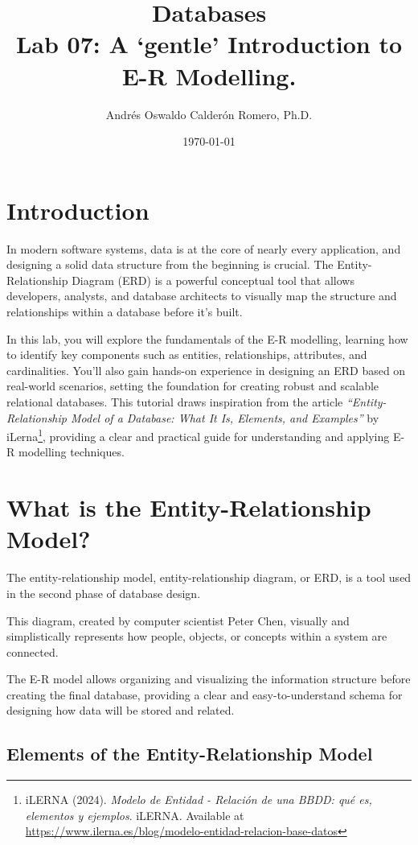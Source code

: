 \documentclass{article}
\title{Databases \\ Lab 07: A `gentle' Introduction to E-R Modelling.}
\author{Andrés Oswaldo Calderón Romero, Ph.D.}
\date{\today}
\begin{document}
\maketitle

\section{Introduction}

In modern software systems, data is at the core of nearly every application, and designing a solid data structure from the beginning is crucial. The Entity-Relationship Diagram (ERD) is a powerful conceptual tool that allows developers, analysts, and database architects to visually map the structure and relationships within a database before it's built.

In this lab, you will explore the fundamentals of the E-R modelling, learning how to identify key components such as entities, relationships, attributes, and cardinalities. You'll also gain hands-on experience in designing an ERD based on real-world scenarios, setting the foundation for creating robust and scalable relational databases. This tutorial draws inspiration from the article \textit{``Entity-Relationship Model of a Database: What It Is, Elements, and Examples''} by iLerna\footnote{
    iLERNA (2024). \textit{Modelo de Entidad - Relación de una BBDD: qué es, elementos y ejemplos}. iLERNA. Available at \url{https://www.ilerna.es/blog/modelo-entidad-relacion-base-datos}
}, providing a clear and practical guide for understanding and applying E-R modelling techniques.

\section{What is the Entity-Relationship Model?}

The entity-relationship model, entity-relationship diagram, or ERD, is a tool used in the second phase of database design.

This diagram, created by computer scientist Peter Chen, visually and simplistically represents how people, objects, or concepts within a system are connected.

The E-R model allows organizing and visualizing the information structure before creating the final database, providing a clear and easy-to-understand schema for designing how data will be stored and related.

\subsection{Elements of the Entity-Relationship Model}
\end{document}
